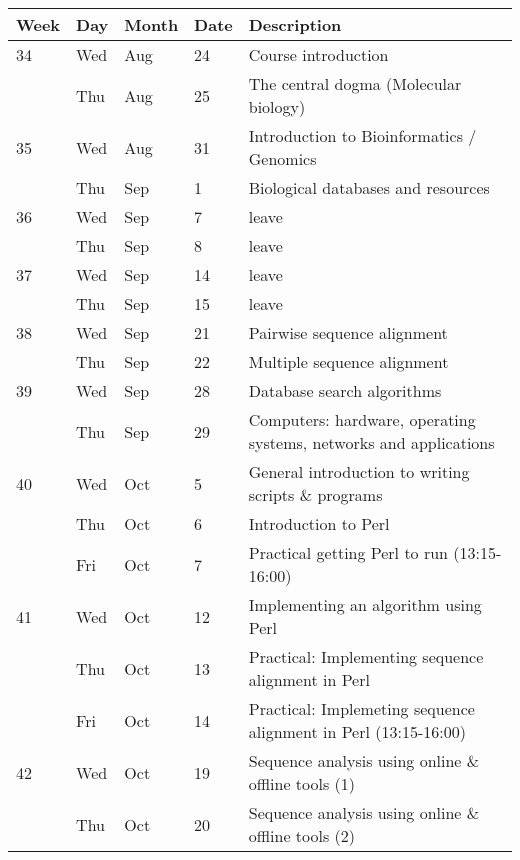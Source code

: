 
\begin{tabu}{ l l l l| l}
  Week & Day & Month & Date & Description \\
  \hline
  34 & Wed & Aug & 24 & Course introduction \\
  & Thu & Aug & 25 & The central dogma (Molecular biology) \\
  35 & Wed & Aug & 31 & Introduction to Bioinformatics / Genomics \\
  & Thu & Sep & 1 & Biological databases and resources \\
  36 & Wed & Sep & 7 & leave \\
  & Thu & Sep & 8 & leave \\
  37 & Wed & Sep & 14 & leave  \\
  & Thu & Sep & 15 &  leave \\
  38 & Wed & Sep & 21 & Pairwise sequence alignment \\
  & Thu & Sep & 22 & Multiple sequence alignment \\
  39 & Wed & Sep & 28 & Database search algorithms  \\
  & Thu & Sep & 29 &  Computers: hardware, operating systems, networks and applications \\
  40 & Wed & Oct & 5 & General introduction to writing scripts \& programs \\
  & Thu & Oct & 6 & Introduction to Perl \\
  \rowfont{\color{blue!75}}
  & Fri & Oct & 7 & Practical getting Perl to run (13:15-16:00) \\
  41 & Wed & Oct & 12 & Implementing an algorithm using Perl \\
  & Thu & Oct & 13 & Practical: Implementing sequence alignment in Perl \\
  \rowfont{\color{blue!75}}
  & Fri & Oct & 14 & Practical: Implemeting sequence alignment in Perl (13:15-16:00) \\
  42 & Wed & Oct & 19 & Sequence analysis using online \& offline tools (1) \\
  & Thu & Oct & 20 & Sequence analysis using online \& offline tools (2) \\

\end{tabu}
